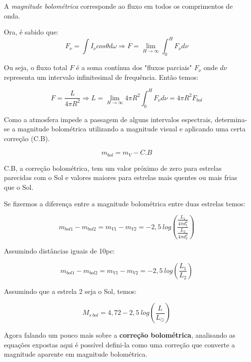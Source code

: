 A \textit{magnitude bolométrica} corresponde ao fluxo em todos os comprimentos de onda.

Ora, é sabido que:
$$F_{\nu} = \int I_{\nu} cos \theta d\omega \Rightarrow F = \lim_{H \to \infty} \int^{H}_{0} F_{\nu} d\nu$$

Ou seja, o fluxo total $F$ é a soma contínua dos "fluxos parciais" $F_{\nu}$ onde $d\nu$ representa um intervalo infinitesimal de frequência. Então temos:

$$F = \frac{L}{4 \pi R^{2}} \Rightarrow L = \lim_{H \to \infty} 4 \pi R^{2} \int^{H}_{0} F_{\nu} d\nu = 4 \pi R^{2} F_{bol}$$

Como a atmosfera impede a passagem de alguns intervalos espectrais, determina-se a magnitude bolométrica utilizando a magnitude visual e aplicando uma certa correção (C.B).

$$m_{bol} = m_{V} - C.B$$

C.B, a correção bolométrica, tem um valor próximo de zero para estrelas parecidas com o Sol e valores maiores para estrelas mais quentes ou mais frias que o Sol.

Se fizermos a diferença entre a magnitude bolométrica entre duas estrelas temos:

$$m_{bol1} - m_{bol2} = m_{V1} - m_{V2} = -2,5 \ log \left( \frac{\frac{L_{1}}{4 \pi d_{1}^{2}}}{\frac{L_{2}}{4 \pi d_{2}^{2}}} \right)$$

 Assumindo distâncias iguais de 10pc:
 
$$m_{bol1} - m_{bol2} = m_{V1} - m_{V2} = -2,5 \ log \left(  \frac{L_{1}}{L_{2}}\right)$$

Assumindo que a estrela 2 seja o Sol, temos:

$$M_{s \ bol} = 4,72 - 2,5 \ log \left( \frac{L}{L_{\odot}} \right)$$

Agora falando um pouco mais sobre a \textbf{correção bolométrica}, analisando as equações expostas aqui é possível defini-la como uma correção que converte a magnitude aparente em magnitude bolométrica.


